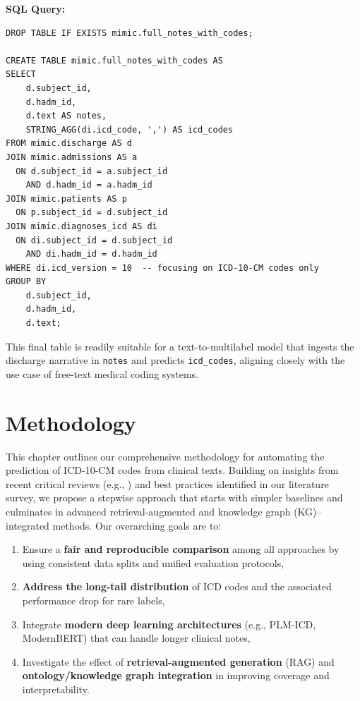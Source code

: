 \documentclass[12pt,a4paper]{report}
\begin{document}
\noindent \textbf{SQL Query:}
\begin{verbatim}
DROP TABLE IF EXISTS mimic.full_notes_with_codes;

CREATE TABLE mimic.full_notes_with_codes AS
SELECT
    d.subject_id,
    d.hadm_id,
    d.text AS notes,
    STRING_AGG(di.icd_code, ',') AS icd_codes
FROM mimic.discharge AS d
JOIN mimic.admissions AS a
  ON d.subject_id = a.subject_id
    AND d.hadm_id = a.hadm_id
JOIN mimic.patients AS p
  ON p.subject_id = d.subject_id
JOIN mimic.diagnoses_icd AS di
  ON di.subject_id = d.subject_id
    AND di.hadm_id = d.hadm_id
WHERE di.icd_version = 10  -- focusing on ICD-10-CM codes only
GROUP BY
    d.subject_id,
    d.hadm_id,
    d.text;
\end{verbatim}


\noindent This final table is readily suitable for a text-to-multilabel model that ingests the discharge narrative in \texttt{notes} and predicts \texttt{icd\_codes}, aligning closely with the use case of free-text medical coding systems.




\chapter{Methodology}

This chapter outlines our comprehensive methodology for automating the prediction of ICD-10-CM codes from clinical texts. Building on insights from recent critical reviews (e.g., \cite{edin2023automated,nguyen2023mimicivicd}) and best practices identified in our literature survey, we propose a stepwise approach that starts with simpler baselines and culminates in advanced retrieval-augmented and knowledge graph (KG)–integrated methods. Our overarching goals are to:

\begin{enumerate}
    \item Ensure a \textbf{fair and reproducible comparison} among all approaches by using consistent data splits and unified evaluation protocols,
    \item \textbf{Address the long-tail distribution} of ICD codes and the associated performance drop for rare labels,
    \item Integrate \textbf{modern deep learning architectures} (e.g., PLM-ICD, ModernBERT) that can handle longer clinical notes,
    \item Investigate the effect of \textbf{retrieval-augmented generation} (RAG) and \textbf{ontology/knowledge graph integration} in improving coverage and interpretability.
\end{enumerate}
\end{document}
